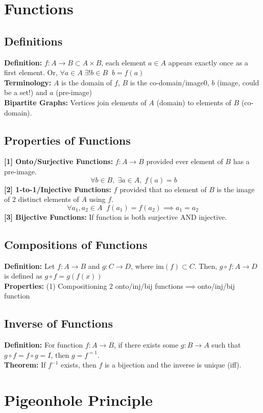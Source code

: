 \section{Functions}
\subsection{Definitions}
\textbf{Definition:} $f: A \rightarrow B \subset A \times B$, each element $a \in A$ appears exactly once as a first element. Or, $\forall a \in A\;\exists! b \in B\;\;b = f(a)$\\
\textbf{Terminology:} $A$ is the domain of $f$, $B$ is the co-domain/image0, $b$ (image, could be a set!) and $a$ (pre-image)\\
\textbf{Bipartite Graphs:} Vertices join elements of $A$ (domain) to elements of $B$ (co-domain).
\subsection{Properties of Functions}
\textbf{[1] Onto/Surjective Functions:} $f:A \rightarrow B$ provided ever element of $B$ has a pre-image.
$$
\;\forall b \in B,\;\exists a \in A,\;f(a) = b
$$
\textbf{[2] 1-to-1/Injective Functions:} $f$ provided that no element of $B$ is the image of $2$ distinct elements of $A$ using $f$.
$$
\forall a_1,a_2 \in A\;\;f(a_1) = f(a_2) \implies a_1 = a_2
$$
\textbf{[3] Bijective Functions:} If function is both surjective AND injective.
\subsection{Compositions of Functions}
\textbf{Definition:} Let $f: A \rightarrow B$ and $g: C \rightarrow D$, where $\text{im}(f) \subset C$. Then, $g \circ f: A \rightarrow D$ is defined as $g \circ f = g(f(x))$ \\
\textbf{Properties:} (1) Compositioning $2$ onto/inj/bij functions$\implies$onto/inj/bij function
\subsection{Inverse of Functions}
\textbf{Definition:} For function $f: A \rightarrow B$, if there exists some $g: B \rightarrow A$ such that $g \circ f = f \circ g = I$, then $g = f^{=1}$.\\
\textbf{Theorem:} If $f^{-1}$ exists, then $f$ is a bijection and the inverse is unique (iff).


\pagebreak
\section{Pigeonhole Principle}
